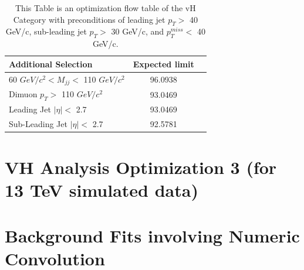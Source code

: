 \documentclass[12pt]{article}
\begin{document}
\begin{table}[!hbtp]
  \begin{center}
    \caption{ \label{tab:ExpectedLimits}
        This Table is an optimization flow table of the vH Category with preconditions of leading jet $p_{T} >$ 40
	GeV/c, sub-leading jet $p_{T} >$ 30 GeV/c, and $p_{T}^{miss} <$ 40 GeV/c.
    }
    \begin{tabular}{lcc} \hline \hline
         Additional Selection & Expected limit \\ \hline
         60 $GeV/c^{2} < M_{jj} <$ 110 $GeV/c^{2}$ & 96.0938  \\
         Dimuon $p_{T} >$ 110 $GeV/c^{2}$ & 93.0469 \\
	 Leading Jet $|\eta| <$ 2.7 & 93.0469 \\
	 Sub-Leading Jet $|\eta| <$ 2.7 & 92.5781 \\
     \hline \hline
    \end{tabular}
  \end{center}
\end{table}

\section{VH Analysis Optimization 3 (for 13 TeV simulated data)}

\section{Background Fits involving Numeric Convolution}
\end{document}
